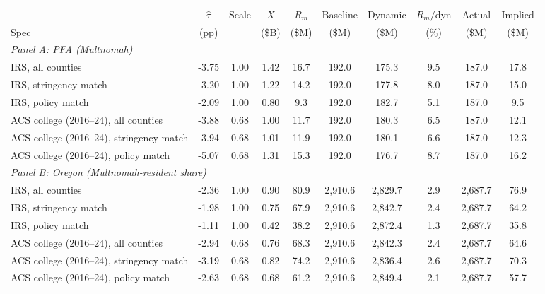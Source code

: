 \begin{tabular}{l*{9}{c}}
\toprule
 & $\hat\tau$ & Scale & $X$ & $R_m$ & Baseline & Dynamic & $R_m/$dyn & Actual & Implied \\
Spec & (pp) & & (\$B) & (\$M) & (\$M) & (\$M) & (\%) & (\$M) & (\$M) \\
\midrule
\multicolumn{10}{l}{\textit{Panel A: PFA (Multnomah)}} \\
IRS, all counties & -3.75 & 1.00 &  1.42 &      16.7 &     192.0 &     175.3 &   9.5 &     187.0 &      17.8 \\
IRS, stringency match & -3.20 & 1.00 &  1.22 &      14.2 &     192.0 &     177.8 &   8.0 &     187.0 &      15.0 \\
IRS, policy match & -2.09 & 1.00 &  0.80 &       9.3 &     192.0 &     182.7 &   5.1 &     187.0 &       9.5 \\
ACS college (2016--24), all counties & -3.88 & 0.68 &  1.00 &      11.7 &     192.0 &     180.3 &   6.5 &     187.0 &      12.1 \\
ACS college (2016--24), stringency match & -3.94 & 0.68 &  1.01 &      11.9 &     192.0 &     180.1 &   6.6 &     187.0 &      12.3 \\
ACS college (2016--24), policy match & -5.07 & 0.68 &  1.31 &      15.3 &     192.0 &     176.7 &   8.7 &     187.0 &      16.2 \\
\midrule
\multicolumn{10}{l}{\textit{Panel B: Oregon (Multnomah-resident share)}} \\
IRS, all counties & -2.36 & 1.00 &  0.90 &      80.9 &   2,910.6 &   2,829.7 &   2.9 &   2,687.7 &      76.9 \\
IRS, stringency match & -1.98 & 1.00 &  0.75 &      67.9 &   2,910.6 &   2,842.7 &   2.4 &   2,687.7 &      64.2 \\
IRS, policy match & -1.11 & 1.00 &  0.42 &      38.2 &   2,910.6 &   2,872.4 &   1.3 &   2,687.7 &      35.8 \\
ACS college (2016--24), all counties & -2.94 & 0.68 &  0.76 &      68.3 &   2,910.6 &   2,842.3 &   2.4 &   2,687.7 &      64.6 \\
ACS college (2016--24), stringency match & -3.19 & 0.68 &  0.82 &      74.2 &   2,910.6 &   2,836.4 &   2.6 &   2,687.7 &      70.3 \\
ACS college (2016--24), policy match & -2.63 & 0.68 &  0.68 &      61.2 &   2,910.6 &   2,849.4 &   2.1 &   2,687.7 &      57.7 \\
\bottomrule
\end{tabular}
